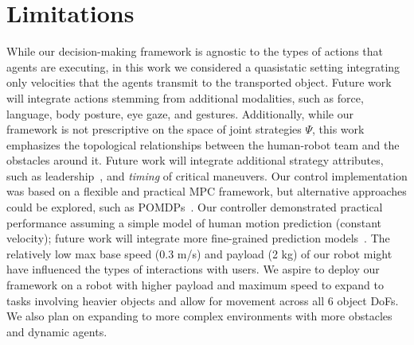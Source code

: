 \section{Limitations}\label{sec:limitations}

While our decision-making framework is agnostic to the types of actions that agents are executing, in this work we considered a quasistatic setting integrating only velocities that the agents transmit to the transported object. Future work will integrate actions stemming from additional modalities, such as force, language, body posture, eye gaze, and gestures. Additionally, while our framework is not prescriptive on the space of joint strategies $\Psi$, this work emphasizes the topological relationships between the human-robot team and the obstacles around it. Future work will integrate additional strategy attributes, such as leadership~\citep{mortl2012role}, and \emph{timing} of critical maneuvers. Our control implementation was based on a flexible and practical MPC framework, but alternative approaches could be explored, such as POMDPs~\citep{nikolaidis2017human}. Our controller demonstrated practical performance assuming a simple model of human motion prediction (constant velocity); future work will integrate more fine-grained prediction models~\citep{salzmann2023hst,yasar2024posetron}. The relatively low max base speed (0.3 m/s) and payload (2 kg) of our robot might have influenced the types of interactions with users. We aspire to deploy our framework on a robot with higher payload and maximum speed to expand to tasks involving heavier objects and allow for movement across all 6 object DoFs. We also plan on expanding to more complex environments with more obstacles and dynamic agents.
